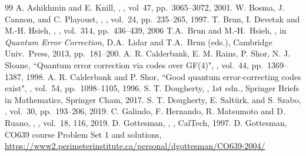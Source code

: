 \documentclass{article}
\theoremstyle{remark}
\theoremstyle{definition}
\numberwithin{equation}{section}
\begin{document}
\begin{thebibliography}{99}
 {A. Ashikhmin and E. Knill}, , , vol\ 47, pp.\ 3065--3072, 2001.
 {W. Bosma, J. Cannon, and C. Playoust}, ,  , vol.\ 24, pp.\ 235--265, 1997.
  {T. Brun, I. Devetak and M.-H. Hsieh}, , , vol.\ 314, pp.\ 436--439, 2006
 {T.A.\ Brun and M.-H.\ Hsieh}, , in \emph{Quantum Error Correction}, D.A.\ Lidar and T.A.\ Brun (eds.), Cambridge Univ.\ Press, 2013, pp.\ 181--200.
 { A. R. Calderbank, E. M. Rains, P. Shor, N. J. Sloane}, {``Quantum error correction via codes over GF(4)"}, , vol.\ 44, pp.\ 1369--1387, 1998.
 { A. R. Calderbank and  P. Shor}, {``Good quantum error-correcting codes exist"}, , vol.\ 54, pp.\ 1098--1105, 1996.
 {S. T. Dougherty},  , 1st edn., Springer Briefs in Mathematics, Springer Cham, 2017.
 {S. T. Dougherty,  E. Salt\"{u}rk, and S. Szabo},  , vol.\ 30, pp.\ 193--206, 2019.
 { C. Galindo, F.  Hernando, R. Matsumoto and D. Ruano}, , , vol.\ 18, 116, 2019.
 {D. Gottesman}, , , CalTech, 1997.
 {D. Gottesman}, CO639 course Problem Set 1 and solutions, \url{https://www2.perimeterinstitute.ca/personal/dgottesman/CO639-2004/}

\end{thebibliography}
\end{document}
